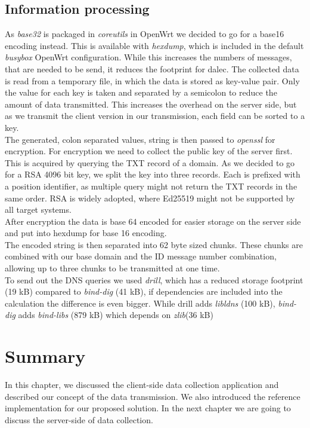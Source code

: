 \subsection{Information processing}
    As \textit{base32} is packaged in \textit{coreutils} in OpenWrt we decided to go for a base16 encoding instead. This is available with \textit{hexdump}, which is included in the default \textit{busybox} OpenWrt configuration. While this increases the numbers of messages, that are needed to be send, it reduces the footprint for dalec. The collected data is read from a temporary file, in which the data is stored as key-value pair. Only the value for each key is taken and separated by a semicolon to reduce the amount of data transmitted. This increases the overhead on the server side, but as we transmit the client version in our transmission, each field can be sorted to a key.\\
    The generated, colon separated values, string is then passed to \textit{openssl} for encryption. For encryption we need to collect the public key of the server first.
    This is acquired by querying the TXT record of a domain. As we decided to go for a RSA 4096 bit key, we split the key into three records. Each is prefixed with a position identifier, as multiple query might not return the TXT records in the same order. RSA is widely adopted, where Ed25519 might not be supported by all target systems.\\
    After encryption the data is base 64 encoded for easier storage on the server side and put into hexdump for base 16 encoding.\\
    The encoded string is then separated into 62 byte sized chunks. These chunks are combined with our base domain and the ID message number combination, allowing up to three chunks to be transmitted at one time.\\
    To send out the DNS queries we used \textit{drill}, which has a reduced storage footprint (19 kB) compared to \textit{bind-dig} (41 kB), if dependencies are included into the calculation the difference is even bigger. While drill adds \textit{libldns} (100 kB), \textit{bind-dig}
    adds \textit{bind-libs} (879 kB) which depends on \textit{zlib}(36 kB)
    
\section{Summary}

In this chapter, we discussed the client-side data collection application and described our concept of the data transmission. We also introduced the reference implementation for our proposed solution. In the next chapter we are going to discuss the server-side of data collection.
%
